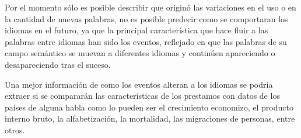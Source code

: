 Por el momento sólo es posible describir que originó las variaciones en el uso o en la cantidad de nuevas palabras, no es posible predecir como se comportaran los idiomas en el futuro, ya que la principal característica que  hace fluir a las palabras entre idiomas han sido los eventos, reflejado en que las palabras de su campo semántico  se muevan a diferentes idiomas y continúen apareciendo o desapareciendo tras el suceso. 

Una mejor información de como los eventos alteran a los idiomas se podría extraer si se compararán las características de los prestamos con  datos de los países de alguna habla como lo pueden ser  el crecimiento economizo, el producto interno bruto, la alfabetización, la mortalidad, las migraciones de personas, entre otros.






